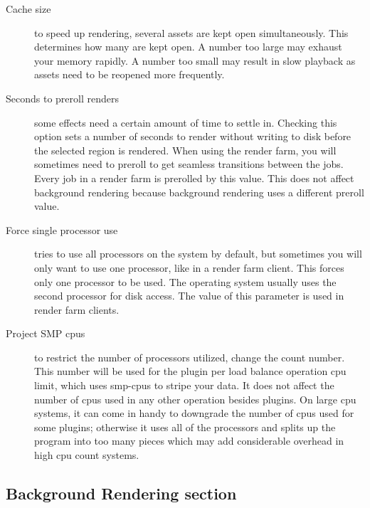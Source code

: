 \begin{description}
    \item[Cache size] to speed up rendering, several assets are kept open simultaneously. This determines how     many are kept open. A number too large may exhaust your memory rapidly. A number too small may result in slow playback as assets need to be reopened more frequently.
    \item[Seconds to preroll renders] some effects need a certain amount of time to settle in. Checking this option sets a number of seconds to render without writing to disk before the selected region is rendered. When using the render farm, you will sometimes need to preroll to get seamless transitions between the     jobs. Every job in a render farm is prerolled by this value. This does not affect background rendering because background rendering uses a different preroll value.
    \item[Force single processor use] \CGG{} tries to use all processors on the system by default, but sometimes you will only want to use one processor, like in a render farm client. This forces only one processor to be used.  The operating system usually uses the second processor for disk access. The value of this parameter is used in render farm clients.
    \item[Project SMP cpus ] to restrict the number of processors utilized, change the count number.  This number will be used for the plugin per load balance operation cpu limit, which uses smp-cpus to stripe your data. It does not affect the number of cpus used in any other \CGG{} operation besides plugins. On large cpu systems, it can come in handy to downgrade the number of cpus used for some plugins; otherwise it uses all of the processors and splits up the program into too many pieces which may add
    considerable overhead in high cpu count systems.
\end{description}

\subsection{Background Rendering section}%
\label{sub:background_rendering_section}

